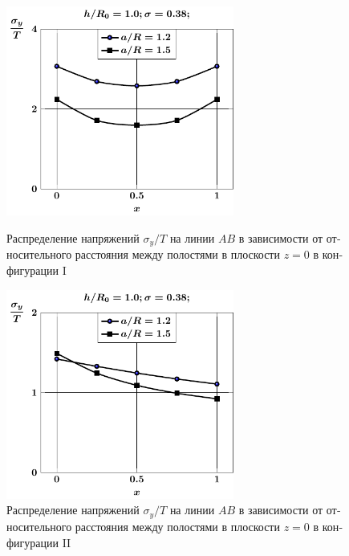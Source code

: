\begin{russian}
\begin{figure}
\centering\footnotesize
\parbox[b]{7.5cm}{\centering\includegraphics[width=7.5cm]{cav2-a-h10-r10-z0-sig_y.pdf}
\caption{Распределение напряжений $\sigma_y/T$ на линии $AB$ в зависимости от относительного расстояния между полостями в плоскости $z=0$ в конфигурации I
\label{f:7:85}}}\hfil\hfil
\parbox[b]{7.5cm}{\centering\includegraphics[width=7.5cm]{cav2a-a-h10-r10-z0-sig_y.pdf}
\caption{Распределение напряжений $\sigma_y/T$ на линии $AB$ в зависимости от относительного расстояния между полостями в плоскости $z=0$ в конфигурации II
\label{f:7:86}}}
\end{figure}


\end{russian}
